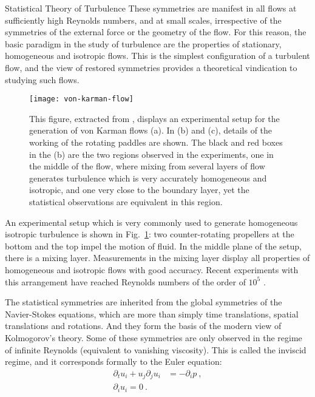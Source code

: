 \begin{chapter}{Statistical Theory of Turbulence}
These symmetries are manifest in all flows at sufficiently high
Reynolds numbers, and at small scales,
irrespective of the symmetries of the external force
or the geometry of the flow.
For this reason, the basic paradigm in the study of turbulence
are the properties of stationary, homogeneous and isotropic flows.
This is the simplest configuration of a turbulent flow, and the
view of restored symmetries provides a theoretical vindication
to studying such flows.

\begin{figure}[t]
    \centering
    \texttt{[image: von-karman-flow]}
    \caption[Experimental setup for a Von Karman flow]
    {This figure, extracted from \textcite{dubrulle2019beyond},
    displays an experimental setup for the generation
    of von Karman flows (a). In (b) and (c), details of the
    working of the rotating paddles are shown.
    The black and red boxes in the (b) are the two regions
    observed in the experiments, one in the middle
    of the flow, where mixing from several layers of flow
    generates turbulence which is very accurately homogeneous
    and isotropic, and one very close to the boundary layer,
    yet the statistical observations are equivalent in this
    region.}
    \label{fig:von-karman-flow}
\end{figure}

An experimental setup which is very commonly used
to generate homogeneous isotropic turbulence is shown in
Fig.~\ref{fig:von-karman-flow}: two counter-rotating propellers
at the bottom and the top impel the motion of fluid.
In the middle plane of the setup, there is a mixing layer.
Measurements in the mixing layer display all properties of
homogeneous and isotropic flows with good accuracy.
Recent experiments with this
arrangement have reached Reynolds numbers of the order of $10^5$
\parencite{debue2018experimental}.

The statistical symmetries are inherited from the global
symmetries of the Navier-Stokes equations, which are more
than simply time translations, spatial translations and rotations.
And they form the basis of the modern view of Kolmogorov's theory.
Some of these symmetries are only observed in the regime
of infinite Reynolds (equivalent to vanishing viscosity).
This is called the inviscid regime, and it corresponds formally to
the Euler equation:
\begin{equation} \label{eq:euler}
\begin{split}
    \partial_t u_i + u_j \partial_j u_i
    &= - \partial_i p \ , \\
    \partial_i u_i = 0 \ .
\end{split}
\end{equation}


\end{chapter}
